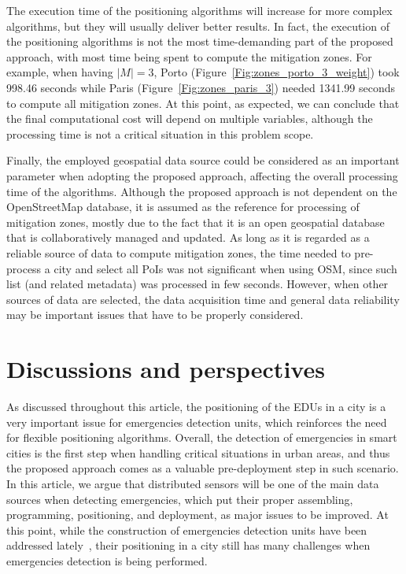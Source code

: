 \begin{refsection}
The execution time of the positioning algorithms will increase for more complex algorithms, but they will usually deliver better results. In fact, the execution of the positioning algorithms is not the most time-demanding part of the proposed approach, with most time being spent to compute the mitigation zones. For example, when having $|M|=3$, Porto (Figure~\ref{Fig:zones_porto_3_weight}) took 998.46 seconds while Paris (Figure~\ref{Fig:zones_paris_3}) needed 1341.99 seconds to compute all mitigation zones. At this point, as expected, we can conclude that the final computational cost will depend on multiple variables, although the processing time is not a critical situation in this problem scope.

Finally, the employed geospatial data source could be considered as an important parameter when adopting the proposed approach, affecting the overall processing time of the algorithms. Although the proposed approach is not dependent on the OpenStreetMap database, it is assumed as the reference for processing of mitigation zones, mostly due to the fact that it is an open geospatial database that is collaboratively managed and updated. As long as it is regarded as a reliable source of data to compute mitigation zones, the time needed to pre-process a city and select all PoIs was not significant when using OSM, since such list (and related metadata) was processed in few seconds. However, when other sources of data are selected, the data acquisition time and general data reliability may be important issues that have to be properly considered.

\section{Discussions and perspectives}\label{S:6}

As discussed throughout this article, the positioning of the EDUs in a city is a very important issue for emergencies detection units, which reinforces the need for flexible positioning algorithms. Overall, the detection of emergencies in smart cities is the first step when handling critical situations in urban areas, and thus the proposed approach comes as a valuable pre-deployment step in such scenario. In this article, we argue that distributed sensors will be one of the main data sources when detecting emergencies, which put their proper assembling, programming, positioning, and deployment, as major issues to be improved. At this point, while the construction of emergencies detection units have been addressed lately~\cite{hardware1,hardware2}, their positioning in a city still has many challenges when emergencies detection is being performed.


\end{refsection}
